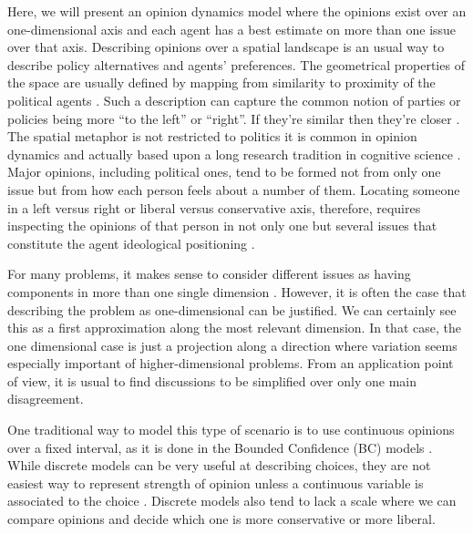 \documentclass{article}
\begin{document}
Here, we will present an opinion dynamics model \cite{castellanoetal07,
  galam12a, galametal82, galammoscovici91, sznajd00, deffuantetal00, martins08a}
where the opinions exist over an one-dimensional axis and each agent has a best
estimate on more than one issue over that axis. Describing opinions over a
spatial landscape is an usual way to describe policy alternatives and agents'
preferences. The geometrical properties of the space are usually defined by
mapping from similarity to proximity of the political agents
\cite{downs1957economic, laver2014measuring, tomz2008candidate}. Such a
description can capture the common notion of parties or policies being more ``to
the left'' or ``right''. If they're similar then they're closer
\cite{van2005political, miller2015spatial}. The spatial metaphor is not
restricted to politics it is common in opinion dynamics and actually based upon
a long research tradition in cognitive science \cite{aisbett2001general,
  attneave1950dimensions,gardenfors2004conceptual}. Major opinions, including
political ones, tend to be formed not from only one issue but from how each
person feels about a number of them. Locating someone in a left versus right or
liberal versus conservative axis, therefore, requires inspecting the opinions of
that person in not only one but several issues that constitute the agent
ideological positioning \cite{benoit2006party}.

For many problems, it makes sense to consider different issues as having
components in more than one single dimension \cite{vicenteetal08b}. However, it
is often the case that describing the problem as one-dimensional can be
justified. We can certainly see this as a first approximation along the most
relevant dimension. In that case, the one dimensional case is just a projection
along a direction where variation seems especially important of
higher-dimensional problems. From an application point of view, it is usual to
find discussions to be simplified over only one main disagreement.

One traditional way to model this type of scenario is to use continuous opinions
over a fixed interval, as it is done in the Bounded Confidence (BC) models
\cite{deffuantetal00,hegselmannkrause02}. While discrete models
\cite{galametal82,galammoscovici91,sznajd00} can be very useful at describing
choices, they are not easiest way to represent strength of opinion unless a
continuous variable is associated to the choice \cite{martins08a}. Discrete
models also tend to lack a scale where we can compare opinions and decide which
one is more conservative or more liberal.
\end{document}
